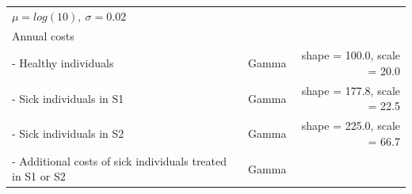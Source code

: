 \documentclass[
]{article}
\begin{document}
\begin{longtable}[]{@{}lrr@{}}
\begin{minipage}[t]{0.42\columnwidth}
\(\mu = log(10), \ \sigma = 0.02\)\strut
\end{minipage}\tabularnewline
\begin{minipage}[t]{0.32\columnwidth}\raggedright
Annual costs\strut
\end{minipage} & \begin{minipage}[t]{0.17\columnwidth}\raggedleft
\strut
\end{minipage} & \begin{minipage}[t]{0.42\columnwidth}\raggedleft
\strut
\end{minipage}\tabularnewline
\begin{minipage}[t]{0.32\columnwidth}\raggedright
- Healthy individuals\strut
\end{minipage} & \begin{minipage}[t]{0.17\columnwidth}\raggedleft
Gamma\strut
\end{minipage} & \begin{minipage}[t]{0.42\columnwidth}\raggedleft
shape = 100.0, scale = 20.0\strut
\end{minipage}\tabularnewline
\begin{minipage}[t]{0.32\columnwidth}\raggedright
- Sick individuals in S1\strut
\end{minipage} & \begin{minipage}[t]{0.17\columnwidth}\raggedleft
Gamma\strut
\end{minipage} & \begin{minipage}[t]{0.42\columnwidth}\raggedleft
shape = 177.8, scale = 22.5\strut
\end{minipage}\tabularnewline
\begin{minipage}[t]{0.32\columnwidth}\raggedright
- Sick individuals in S2\strut
\end{minipage} & \begin{minipage}[t]{0.17\columnwidth}\raggedleft
Gamma\strut
\end{minipage} & \begin{minipage}[t]{0.42\columnwidth}\raggedleft
shape = 225.0, scale = 66.7\strut
\end{minipage}\tabularnewline
\begin{minipage}[t]{0.32\columnwidth}\raggedright
- Additional costs of sick individuals treated in S1 or S2\strut
\end{minipage} & \begin{minipage}[t]{0.17\columnwidth}\raggedleft
Gamma\strut
\end{minipage} & \begin{minipage}[t]{0.42\columnwidth}\raggedleft

\end{minipage}
\end{longtable}
\end{document}

